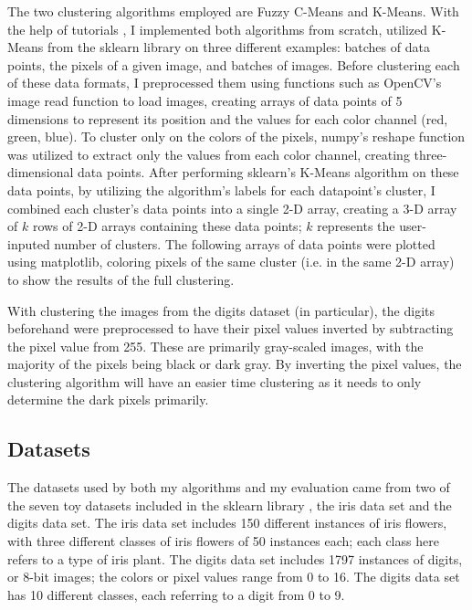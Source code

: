\documentclass[10pt,twocolumn]{article}
\begin{document}
The two clustering algorithms employed are Fuzzy C-Means and K-Means. With the help of tutorials \cite{Khushijain2021,TheAcademician2020, Jordan2018,Aktas2021}, I implemented both algorithms from scratch, utilized K-Means from the sklearn library on three different examples: batches of data points, the pixels of a given image, and batches of images. Before clustering each of these data formats, I preprocessed them using functions such as OpenCV’s image read function to load images, creating arrays of data points of 5 dimensions to represent its position and the values for each color channel (red, green, blue). To cluster only on the colors of the pixels, numpy’s reshape function was utilized to extract only the values from each color channel, creating three-dimensional data points. After performing sklearn’s K-Means algorithm on these data points, by utilizing the algorithm’s labels for each datapoint’s cluster, I combined each cluster’s data points into a single 2-D array, creating a 3-D array of \(k\) rows of 2-D arrays containing these data points; \(k\) represents the user-inputed number of clusters. The following arrays of data points were plotted using matplotlib, coloring pixels of the same cluster (i.e. in the same 2-D array) to show the results of the full clustering. 

With clustering the images from the digits dataset (in particular), the digits beforehand were preprocessed to have their pixel values inverted by subtracting the pixel value from 255. These are primarily gray-scaled images, with the majority of the pixels being black or dark gray. By inverting the pixel values, the clustering algorithm will have an easier time clustering as it needs to only determine the dark pixels primarily.

\subsection {Datasets}

The datasets used by both my algorithms and my evaluation came from two of the seven toy datasets included in the sklearn library \cite{skLearn2020}, the iris data set and the digits data set. The iris data set includes 150 different instances of iris flowers, with three different classes of iris flowers of 50 instances each; each class here refers to a type of iris plant. The digits data set includes 1797 instances of digits, or 8-bit images; the colors or pixel values range from 0 to 16. The digits data set has 10 different classes, each referring to a digit from 0 to 9. 
\end{document}
